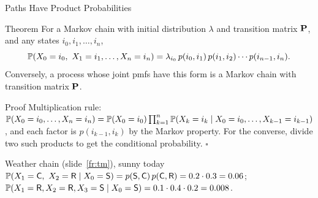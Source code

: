 \begin{frame}{Paths Have Product Probabilities}
  \label{fr:paths}
  \small
  \begin{block}{Theorem}
    For a Markov chain with initial distribution $\lambda$ and transition matrix $\mathbf{P}$, and any states $i_0,i_1,\dots,i_n$,
    \[
      \Prob(X_0=i_0,\ X_1=i_1,\dots,X_n=i_n)=\lambda_{i_0}\,p(i_0,i_1)\,p(i_1,i_2)\cdots p(i_{n-1},i_n).
    \]
    Conversely, a process whose joint pmfs have this form is a Markov chain with transition matrix $\mathbf{P}$.
  \end{block}
  \begin{block}{Proof}
    Multiplication rule: $\mathbb{P}(X_0=i_0,\dots,X_n=i_n)=\mathbb{P}(X_0=i_0)\prod_{k=1}^{n}\mathbb{P}(X_k=i_k\mid X_0=i_0,\dots,X_{k-1}=i_{k-1})$, and each factor is $p(i_{k-1},i_k)$ by the Markov property. For the converse, divide two such products to get the conditional probability. \hfill$\square$
  \end{block}
  \begin{exampleblock}{Weather chain (slide~\ref{fr:tm}), sunny today}
    $\mathbb{P}(X_1=\mathsf{C},\ X_2=\mathsf{R}\mid X_0=\mathsf{S})=p(\mathsf{S},\mathsf{C})\,p(\mathsf{C},\mathsf{R})=0.2\cdot0.3=0.06$; \quad $\mathbb{P}(X_1=\mathsf{R},X_2=\mathsf{R},X_3=\mathsf{S}\mid X_0=\mathsf{S})=0.1\cdot0.4\cdot0.2=0.008$.
  \end{exampleblock}
\end{frame}


